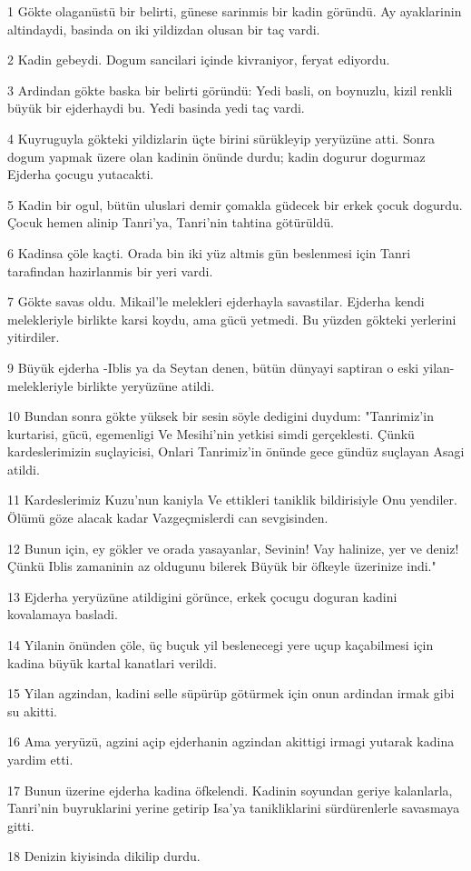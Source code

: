 \par 1 Gökte olaganüstü bir belirti, günese sarinmis bir kadin göründü. Ay ayaklarinin altindaydi, basinda on iki yildizdan olusan bir taç vardi.
\par 2 Kadin gebeydi. Dogum sancilari içinde kivraniyor, feryat ediyordu.
\par 3 Ardindan gökte baska bir belirti göründü: Yedi basli, on boynuzlu, kizil renkli büyük bir ejderhaydi bu. Yedi basinda yedi taç vardi.
\par 4 Kuyruguyla gökteki yildizlarin üçte birini sürükleyip yeryüzüne atti. Sonra dogum yapmak üzere olan kadinin önünde durdu; kadin dogurur dogurmaz Ejderha çocugu yutacakti.
\par 5 Kadin bir ogul, bütün uluslari demir çomakla güdecek bir erkek çocuk dogurdu. Çocuk hemen alinip Tanri'ya, Tanri'nin tahtina götürüldü.
\par 6 Kadinsa çöle kaçti. Orada bin iki yüz altmis gün beslenmesi için Tanri tarafindan hazirlanmis bir yeri vardi.
\par 7 Gökte savas oldu. Mikail'le melekleri ejderhayla savastilar. Ejderha kendi melekleriyle birlikte karsi koydu, ama gücü yetmedi. Bu yüzden gökteki yerlerini yitirdiler.
\par 9 Büyük ejderha -Iblis ya da Seytan denen, bütün dünyayi saptiran o eski yilan- melekleriyle birlikte yeryüzüne atildi.
\par 10 Bundan sonra gökte yüksek bir sesin söyle dedigini duydum: "Tanrimiz'in kurtarisi, gücü, egemenligi Ve Mesihi'nin yetkisi simdi gerçeklesti. Çünkü kardeslerimizin suçlayicisi, Onlari Tanrimiz'in önünde gece gündüz suçlayan Asagi atildi.
\par 11 Kardeslerimiz Kuzu'nun kaniyla Ve ettikleri taniklik bildirisiyle Onu yendiler. Ölümü göze alacak kadar Vazgeçmislerdi can sevgisinden.
\par 12 Bunun için, ey gökler ve orada yasayanlar, Sevinin! Vay halinize, yer ve deniz! Çünkü Iblis zamaninin az oldugunu bilerek Büyük bir öfkeyle üzerinize indi."
\par 13 Ejderha yeryüzüne atildigini görünce, erkek çocugu doguran kadini kovalamaya basladi.
\par 14 Yilanin önünden çöle, üç buçuk yil beslenecegi yere uçup kaçabilmesi için kadina büyük kartal kanatlari verildi.
\par 15 Yilan agzindan, kadini selle süpürüp götürmek için onun ardindan irmak gibi su akitti.
\par 16 Ama yeryüzü, agzini açip ejderhanin agzindan akittigi irmagi yutarak kadina yardim etti.
\par 17 Bunun üzerine ejderha kadina öfkelendi. Kadinin soyundan geriye kalanlarla, Tanri'nin buyruklarini yerine getirip Isa'ya tanikliklarini sürdürenlerle savasmaya gitti.
\par 18 Denizin kiyisinda dikilip durdu.

